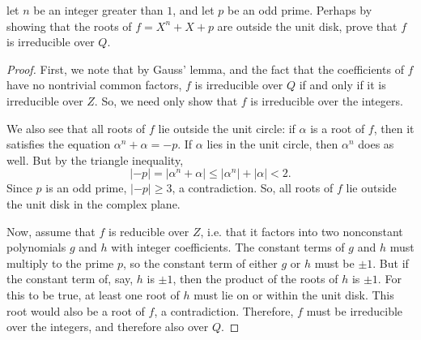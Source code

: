 \documentclass[12pt]{article}
\theoremstyle{definition}
\newenvironment{problem}[2][Problem]{\begin{trivlist}
\item[\hskip \labelsep {\bfseries #1}\hskip \labelsep {\bfseries #2.}]}{\end{trivlist}}
\begin{document}
\begin{problem}{8}
	let $n$ be an integer greater than $1$, and let $p$ be an odd prime. Perhaps by showing that the roots of $f = X^n + X + p$ are outside the unit disk, prove that $f$ is irreducible over $Q$.
	\begin{proof}
		First, we note that by Gauss' lemma, and the fact that the coefficients of $f$ have no nontrivial common factors, $f$ is irreducible over $Q$ if and only if it is irreducible over $Z$. So, we need only show that $f$ is irreducible over the integers.
		\par We also see that all roots of $f$ lie outside the unit circle: if $\alpha$ is a root of $f$, then it satisfies the equation $\alpha^n + \alpha = -p$. If $\alpha$ lies in the unit circle, then $\alpha^n$ does as well. But by the triangle inequality,
		\[\left \lvert { -p } \right \lvert = \left \lvert { \alpha^n + \alpha } \right \lvert \leq \left \lvert { \alpha^n } \right \lvert + \left \lvert { \alpha } \right \lvert  < 2.\]
		Since $p$ is an odd prime, $\left \lvert { -p } \right \lvert \geq 3$, a contradiction. So, all roots of $f$ lie outside the unit disk in the complex plane.
		\par Now, assume that $f$ is reducible over $Z$, i.e. that it factors into two nonconstant polynomials $g$ and $h$ with integer coefficients. The constant terms of $g$ and $h$ must multiply to the prime $p$, so the constant term of either $g$ or $h$ must be $\pm 1$. But if the constant term of, say, $h$ is $\pm 1$, then the product of the roots of $h$ is $\pm 1$. For this to be true, at least one root of $h$ must lie on or within the unit disk. This root would also be a root of $f$, a contradiction. Therefore, $f$ must be irreducible over the integers, and therefore also over $Q$.
	\end{proof}
\end{problem}
\end{document}
